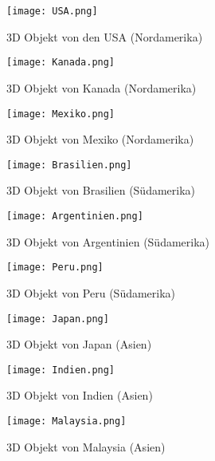 \begin{figure}[!htb]
  \texttt{[image: USA.png]}
  \caption{3D Objekt von den USA (Nordamerika)}\label{fig:usa}
\endminipage\hfill
{}
  \texttt{[image: Kanada.png]}
  \caption{3D Objekt von Kanada (Nordamerika)}\label{fig:kanada}
\endminipage\hfill
\end{figure}

\begin{figure}[!htb]
  \texttt{[image: Mexiko.png]}
  \caption{3D Objekt von Mexiko (Nordamerika)}\label{fig:mexiko}
\endminipage\hfill
{}
  \texttt{[image: Brasilien.png]}
  \caption{3D Objekt von Brasilien (Südamerika)}\label{fig:brasilien}
\endminipage\hfill
\end{figure}

\begin{figure}[!htb]
  \texttt{[image: Argentinien.png]}
  \caption{3D Objekt von Argentinien (Südamerika)}\label{fig:argentinien}
\endminipage\hfill
{}
  \texttt{[image: Peru.png]}
  \caption{3D Objekt von Peru (Südamerika)}\label{fig:peru}
\endminipage\hfill
\end{figure}

\begin{figure}[!htb]
  \texttt{[image: Japan.png]}
  \caption{3D Objekt von Japan (Asien)}\label{fig:japan}
\endminipage\hfill
{}
  \texttt{[image: Indien.png]}
  \caption{3D Objekt von Indien (Asien)}\label{fig:indien}
\endminipage\hfill
\end{figure}

\begin{figure}[!htb]
  \texttt{[image: Malaysia.png]}
  \caption{3D Objekt von Malaysia (Asien)}\label{fig:malaysia}
\endminipage\hfill
\end{figure}


